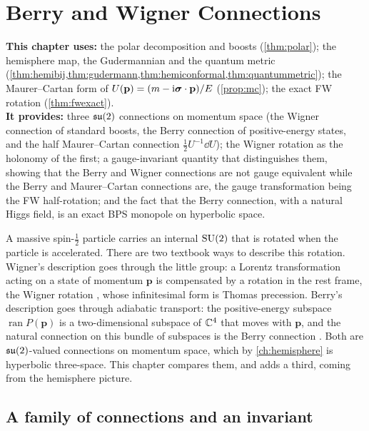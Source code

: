 \chapter{Berry and Wigner Connections}
\label{ch:berrywigner}

\begin{usesbox}
\textbf{This chapter uses:} the polar decomposition and boosts (\cref{thm:polar}); the hemisphere map, the Gudermannian and the quantum metric (\cref{thm:hemibij,thm:gudermann,thm:hemiconformal,thm:quantummetric}); the Maurer--Cartan form of $U(\mathbf p)=(m-\mathrm{i}\boldsymbol{\sigma}\cdot\mathbf p)/E$ (\cref{prop:mc}); the exact FW rotation (\cref{thm:fwexact}).\\
\textbf{It provides:} three $\mathfrak{su}(2)$ connections on momentum space (the Wigner connection of standard boosts, the Berry connection of positive-energy states, and the half Maurer--Cartan connection $\frac12U^{-1}\dd U$); the Wigner rotation as the holonomy of the first; a gauge-invariant quantity that distinguishes them, showing that the Berry and Wigner connections are not gauge equivalent while the Berry and Maurer--Cartan connections are, the gauge transformation being the FW half-rotation; and the fact that the Berry connection, with a natural Higgs field, is an exact BPS monopole on hyperbolic space.
\end{usesbox}

A massive spin-$\frac12$ particle carries an internal $\mathrm{SU}(2)$ that is rotated when the particle is accelerated. There are two textbook ways to describe this rotation. Wigner's description goes through the little group: a Lorentz transformation acting on a state of momentum $\mathbf p$ is compensated by a rotation in the rest frame, the Wigner rotation \cite{Wigner1939}, whose infinitesimal form is Thomas precession. Berry's description goes through adiabatic transport: the positive-energy subspace $\operatorname{ran}P(\mathbf p)$ is a two-dimensional subspace of $\mathbb{C}^4$ that moves with $\mathbf p$, and the natural connection on this bundle of subspaces is the Berry connection \cite{Berry1984}. Both are $\mathfrak{su}(2)$-valued connections on momentum space, which by \cref{ch:hemisphere} is hyperbolic three-space. This chapter compares them, and adds a third, coming from the hemisphere picture.

\section{A family of connections and an invariant}

